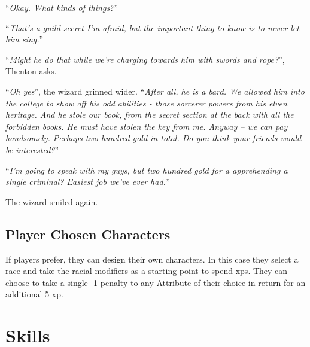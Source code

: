 \begin{multicols}{2}
{\begin{exampletext}
``\emph{Okay.
What kinds of things?}''

``\emph{That's a guild secret I'm afraid, but the important thing to know is to never let him sing.}''

``\emph{Might he do that while we're charging towards him with swords and rope?}'', Thenton asks.

``\emph{Oh yes}'', the wizard grinned wider.
``\emph{After all, he is a bard.
We allowed him into the college to show off his odd abilities - those sorcerer powers from his elven heritage.
And he stole our book, from the secret section at the back with all the forbidden books.
He must have stolen the key from me.
Anyway -- we can pay handsomely.
Perhaps two hundred gold in total.
Do you think your friends would be interested?}''

``\emph{I'm going to speak with my guys, but two hundred gold for a apprehending a single criminal? Easiest job we've ever had.}''

The wizard smiled again.

\end{exampletext}
}{}

\subsection{Player Chosen Characters}

If players prefer, they can design their own characters. In this case they select a race and take the racial modifiers as a starting point to spend \glspl{xp}.  They can choose to take a single -1 penalty to any Attribute of their choice in return for an additional 5 \gls{xp}.


\end{multicols}

\section{Skills}

